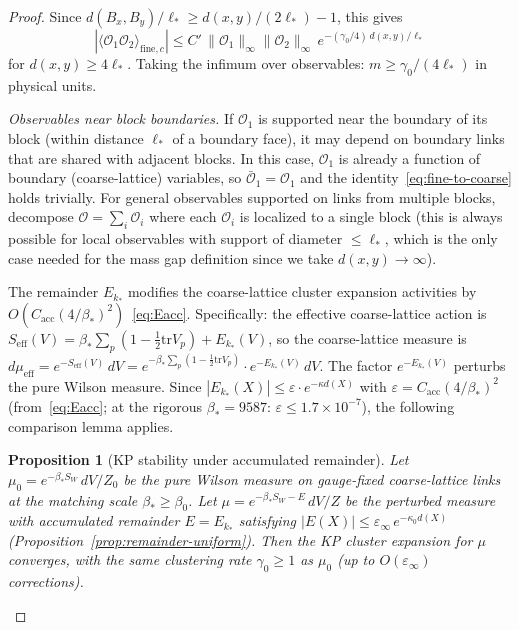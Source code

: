 \documentclass[11pt]{article}
\newtheorem{proposition}[theorem]{Proposition}
\theoremstyle{definition}
\newcommand{\tr}{\mathrm{tr}}
\begin{document}
\begin{proof}
Since $d(B_x,B_y)/\ell_*\ge d(x,y)/(2\ell_*)-1$, this gives
\begin{equation}
|\langle\mathcal{O}_1\mathcal{O}_2\rangle_{\mathrm{fine},c}|
\le C'\,\|\mathcal{O}_1\|_\infty\|\mathcal{O}_2\|_\infty\,
e^{-(\gamma_0/4)\,d(x,y)/\ell_*}
\end{equation}
for $d(x,y)\ge 4\ell_*$.  Taking the infimum over observables:
$m\ge\gamma_0/(4\ell_*)$ in physical units.

\emph{Observables near block boundaries.}
If $\mathcal{O}_1$ is supported near the boundary of its block
(within distance $\ell_*$ of a boundary face), it may depend on
boundary links that are shared with adjacent blocks.
In this case, $\mathcal{O}_1$ is already a function of boundary
(coarse-lattice) variables, so $\bar{\mathcal{O}}_1=\mathcal{O}_1$
and the identity~\eqref{eq:fine-to-coarse} holds trivially.
For general observables supported on links from multiple blocks,
decompose $\mathcal{O}=\sum_i\mathcal{O}_i$ where each $\mathcal{O}_i$
is localized to a single block (this is always possible for local
observables with support of diameter $\le\ell_*$, which is the only
case needed for the mass gap definition since we take
$d(x,y)\to\infty$).

The remainder $E_{k_*}$ modifies the coarse-lattice cluster expansion
activities by $O(C_{\mathrm{acc}}(4/\beta_*)^2)$~\eqref{eq:Eacc}.
Specifically: the effective coarse-lattice action is
$S_{\mathrm{eff}}(V)=\beta_*\sum_p(1-\frac{1}{2}\tr V_p)+E_{k_*}(V)$,
so the coarse-lattice measure is
$d\mu_{\mathrm{eff}}=e^{-S_{\mathrm{eff}}(V)}\,dV
=e^{-\beta_*\sum_p(1-\frac{1}{2}\tr V_p)}\cdot e^{-E_{k_*}(V)}\,dV$.
The factor $e^{-E_{k_*}(V)}$ perturbs the pure Wilson measure.
Since $|E_{k_*}(X)|\le\varepsilon\cdot e^{-\kappa d(X)}$ with
$\varepsilon=C_{\mathrm{acc}}(4/\beta_*)^2$
(from~\eqref{eq:Eacc};
at the rigorous $\beta_*=9587$: $\varepsilon\le 1.7\times 10^{-7}$),
the following comparison lemma applies.

\begin{proposition}[KP stability under accumulated remainder]%
\label{prop:kp-stability}
Let $\mu_0=e^{-\beta_* S_W}\,dV/Z_0$ be the pure Wilson
measure on gauge-fixed coarse-lattice links at the matching
scale $\beta_*\ge\beta_0$.
Let $\mu=e^{-\beta_* S_W-E}\,dV/Z$ be the perturbed measure
with accumulated remainder $E=E_{k_*}$ satisfying
$|E(X)|\le\varepsilon_\infty\,e^{-\kappa_0 d(X)}$
\textup{(}Proposition~\ref{prop:remainder-uniform}\textup{)}.
Then the KP cluster expansion for $\mu$ converges,
with the same clustering rate $\gamma_0\ge 1$ as $\mu_0$
\textup{(}up to $O(\varepsilon_\infty)$ corrections\textup{)}.


\end{proposition}
\end{proof}
\end{document}
